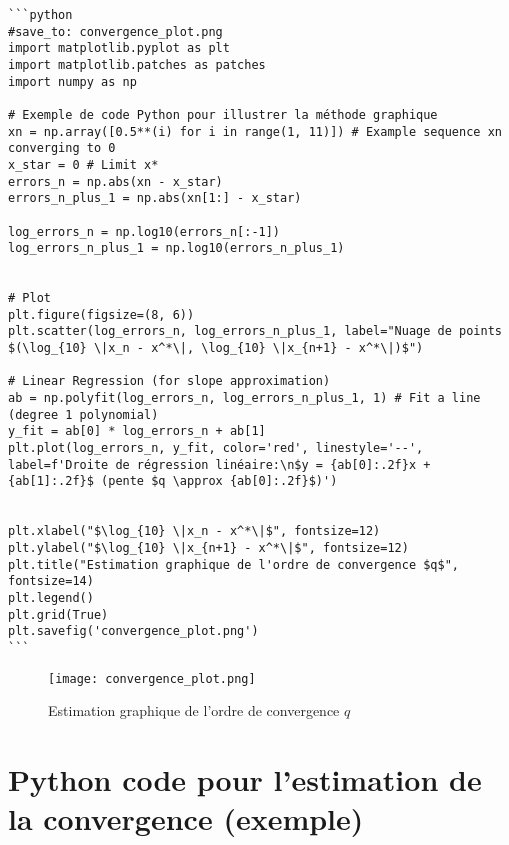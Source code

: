 \documentclass[oneside]{book}
\begin{document}
\begin{verbatim}
```python
#save_to: convergence_plot.png
import matplotlib.pyplot as plt
import matplotlib.patches as patches
import numpy as np

# Exemple de code Python pour illustrer la méthode graphique
xn = np.array([0.5**(i) for i in range(1, 11)]) # Example sequence xn converging to 0
x_star = 0 # Limit x*
errors_n = np.abs(xn - x_star)
errors_n_plus_1 = np.abs(xn[1:] - x_star)

log_errors_n = np.log10(errors_n[:-1])
log_errors_n_plus_1 = np.log10(errors_n_plus_1)


# Plot
plt.figure(figsize=(8, 6))
plt.scatter(log_errors_n, log_errors_n_plus_1, label="Nuage de points $(\log_{10} \|x_n - x^*\|, \log_{10} \|x_{n+1} - x^*\|)$")

# Linear Regression (for slope approximation)
ab = np.polyfit(log_errors_n, log_errors_n_plus_1, 1) # Fit a line (degree 1 polynomial)
y_fit = ab[0] * log_errors_n + ab[1]
plt.plot(log_errors_n, y_fit, color='red', linestyle='--', label=f'Droite de régression linéaire:\n$y = {ab[0]:.2f}x + {ab[1]:.2f}$ (pente $q \approx {ab[0]:.2f}$)')


plt.xlabel("$\log_{10} \|x_n - x^*\|$", fontsize=12)
plt.ylabel("$\log_{10} \|x_{n+1} - x^*\|$", fontsize=12)
plt.title("Estimation graphique de l'ordre de convergence $q$", fontsize=14)
plt.legend()
plt.grid(True)
plt.savefig('convergence_plot.png')
```
\end{verbatim}

\begin{figure}[h]
    \centering
    \texttt{[image: convergence\_plot.png]}
    \caption{Estimation graphique de l'ordre de convergence $q$}
    \label{fig:convergence_order_estimation}
\end{figure}


\section{Python code pour l'estimation de la convergence (exemple)}
\end{document}
